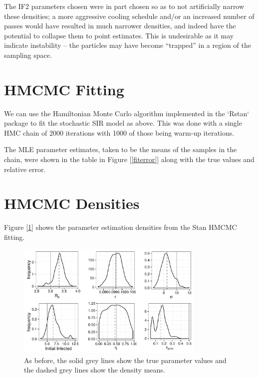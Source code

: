     The IF2 parameters chosen were in part chosen so as to not artificially narrow these densities; a more aggressive cooling schedule and/or an increased number of passes would have resulted in much narrower densities, and indeed have the potential to collapse them to point estimates. This is undesirable as it may indicate instability -- the particles may have become ``trapped'' in a region of the sampling space.


\section{HMCMC Fitting}

	We can use the Hamiltonian Monte Carlo algorithm implemented in the `Rstan` package to fit the stochastic SIR model as above. This was done with a single HMC chain of 2000 iterations with 1000 of those being warm-up iterations.

	The MLE parameter estimates, taken to be the means of the samples in the chain, were shown in the table in Figure [\ref{fiterror}] along with the true values and relative error.


\section{HMCMC Densities}

	Figure [\ref{sc1hmckernels}] shows the parameter estimation densities from the Stan HMCMC fitting.

	\begin{figure}
        \centering
        \captionsetup{width=.8\linewidth}
        \includegraphics[width=0.8\textwidth]{./images/hmckernels.pdf}
        \caption{As before, the solid grey lines show the true parameter values and the dashed grey lines show the density means. \label{sc1hmckernels}}
    \end{figure}


